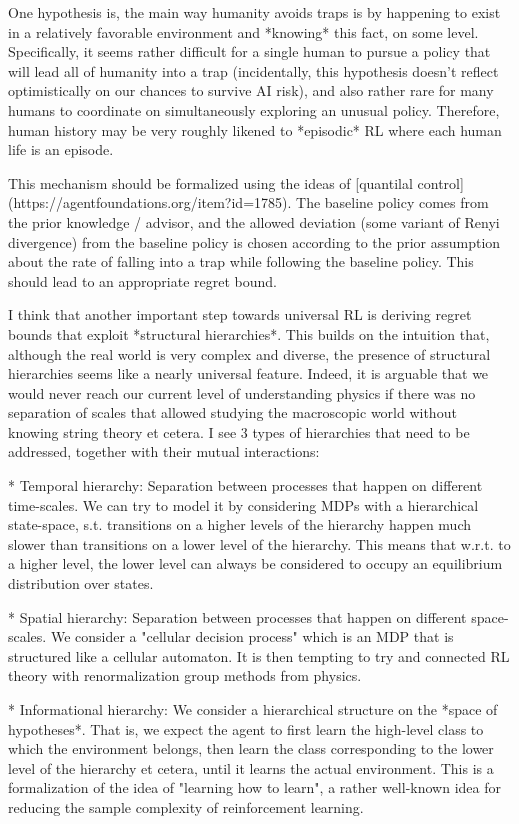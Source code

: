 \documentclass[a4paper]{article}
\begin{document}
One hypothesis is, the main way humanity avoids traps is by happening to exist in a relatively favorable environment and *knowing* this fact, on some level. Specifically, it seems rather difficult for a single human to pursue a policy that will lead all of humanity into a trap (incidentally, this hypothesis doesn't reflect optimistically on our chances to survive AI risk), and also rather rare for many humans to coordinate on simultaneously exploring an unusual policy. Therefore, human history may be very roughly likened to *episodic* RL where each human life is an episode.

This mechanism should be formalized using the ideas of [quantilal control](https://agentfoundations.org/item?id=1785). The baseline policy comes from the prior knowledge / advisor, and the allowed deviation (some variant of Renyi divergence) from the baseline policy is chosen according to the prior assumption about the rate of falling into a trap while following the baseline policy. This should lead to an appropriate regret bound.

I think that another important step towards universal RL is deriving regret bounds that exploit *structural hierarchies*. This builds on the intuition that, although the real world is very complex and diverse, the presence of structural hierarchies seems like a nearly universal feature. Indeed, it is arguable that we would never reach our current level of understanding physics if there was no separation of scales that allowed studying the macroscopic world without knowing string theory et cetera. I see 3 types of hierarchies that need to be addressed, together with their mutual interactions:

* Temporal hierarchy: Separation between processes that happen on different time-scales. We can try to model it by considering MDPs with a hierarchical state-space, s.t. transitions on a higher levels of the hierarchy happen much slower than transitions on a lower level of the hierarchy. This means that w.r.t. to a higher level, the lower level can always be considered to occupy an equilibrium distribution over states.

* Spatial hierarchy: Separation between processes that happen on different space-scales. We consider a "cellular decision process" which is an MDP that is structured like a cellular automaton. It is then tempting to try and connected RL theory with renormalization group methods from physics.

* Informational hierarchy: We consider a hierarchical structure on the *space of hypotheses*. That is, we expect the agent to first learn the high-level class to which the environment belongs, then learn the class corresponding to the lower level of the hierarchy et cetera, until it learns the actual environment. This is a formalization of the idea of "learning how to learn", a rather well-known idea for reducing the sample complexity of reinforcement learning.
\end{document}
